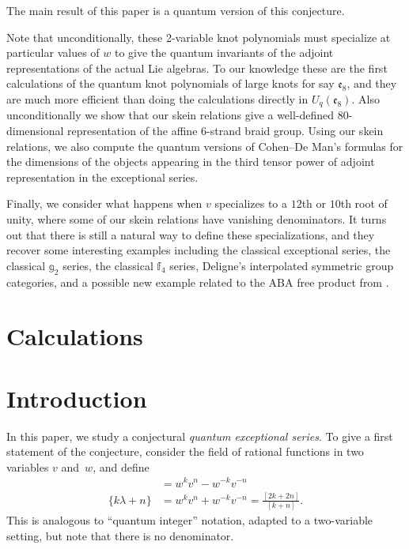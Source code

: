\documentclass[12pt]{amsart}
\begin{document}
The main result of this paper is a quantum version of this conjecture.



 

Note that unconditionally, these 2-variable knot polynomials must specialize at particular values of $w$ to give the quantum invariants of the adjoint representations of the actual Lie algebras.  To our knowledge these are the first calculations of the quantum knot polynomials of large knots for say $\mathfrak{e}_8$, and they are much more efficient than doing the calculations directly in $U_q(\mathfrak{e}_8)$.  Also unconditionally we show that our skein relations give a well-defined $80$-dimensional representation of the affine $6$-strand braid group.  Using our skein relations, we also compute the quantum versions of Cohen--De Man's formulas for the dimensions of the objects appearing in the third tensor power of adjoint representation in the exceptional series.

Finally, we consider what happens when $v$ specializes to a $12$th or $10$th root of unity, where some of our skein relations have vanishing denominators.  It turns out that there is still a natural way to define these specializations, and they recover some interesting examples including the classical exceptional series, the classical $\mathbb{g}_2$ series, the classical $\mathbb{f}_4$ series, Deligne's interpolated symmetric group categories, and a possible new example related to the ABA free product from \cite{???}.


\section{Calculations}
\label{sec:calculations}



\appendix

\section{Introduction}
\label{sec:introduction}

In this paper, we study a conjectural \emph{quantum exceptional
  series}. To give a first statement of the conjecture, consider the
field of rational functions in two variables $v$ and~$w$, and define
\begin{align*}
[k\lambda + n] &= w^kv^n - w^{-k}v^{-n}\\
\{k\lambda + n\} &= w^k v^n + w^{-k} v^{-n} = \frac{[2k+2n]}{[k+n]}.
\end{align*}
This is analogous to ``quantum integer'' notation, adapted to a
two-variable setting, but note that there is no denominator.
\end{document}
